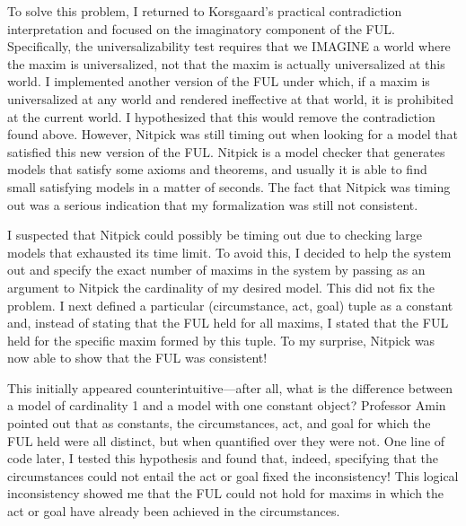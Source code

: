 \begin{isabellebody}
\begin{isamarkuptext}
To solve this problem, I returned to Korsgaard's practical contradiction interpretation and focused 
on the imaginatory component of the FUL. Specifically, the universalizability test requires that we IMAGINE 
a world where the maxim is universalized, not that the maxim is actually universalized at this world. 
I implemented another version of the FUL under which, if a maxim is universalized at any world and rendered
ineffective at that world, it is prohibited at the current world. I hypothesized that this would remove 
the contradiction found above. However, Nitpick was still timing out when looking for a model that
satisfied this new version of the FUL. Nitpick is a model checker that generates models that satisfy 
some axioms and theorems, and usually it is able to find small satisfying models in a matter of seconds. 
The fact that Nitpick was timing out was a serious indication that my formalization was still not 
consistent.

I suspected that Nitpick could possibly be timing out due to checking large models that exhausted its 
time limit. To avoid this, I decided to help the system out and specify the exact number of maxims 
in the system by passing as an argument to Nitpick the cardinality of my desired model. This did not 
fix the problem. I next defined a particular (circumstance, act, goal) tuple as a constant and, instead of
stating that the FUL held for all maxims, I stated that the FUL held for the specific maxim formed by this tuple.
To my surprise, Nitpick was now able to show that the FUL was consistent!

This initially appeared counterintuitive—after all, what is the difference between a model of cardinality 
1 and a model with one constant object? Professor Amin pointed out that as constants, the circumstances, 
act, and goal for which the FUL held were all distinct, but when quantified over they were not. One line 
of code later, I tested this hypothesis and found that, indeed, specifying that the circumstances could 
not entail the act or goal fixed the inconsistency! This logical inconsistency showed me that the FUL 
could not hold for maxims in which the act or goal have already been achieved in the circumstances.


\end{isamarkuptext}
\end{isabellebody}
